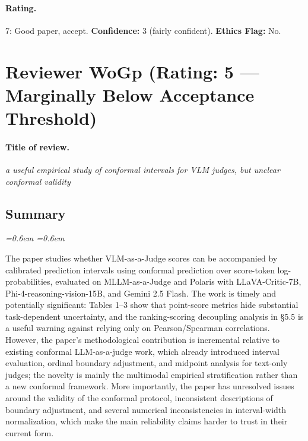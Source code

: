 \documentclass[10pt]{article}
\newenvironment{reviewerquote}{%
  \par\addvspace{0.25ex}\begingroup
  \footnotesize\itshape
  \leftskip=0.6em \rightskip=0.6em
  \color{black!78}
  \setlength{\parskip}{0.35ex plus 0.1ex}
}{%
  \endgroup\par\addvspace{0.25ex}
}
\begin{document}
\paragraph{Rating.} 7: Good paper, accept. \quad \textbf{Confidence:} 3 (fairly confident). \quad \textbf{Ethics Flag:} No.

\section{Reviewer WoGp (Rating: 5 --- Marginally Below Acceptance Threshold)}

\paragraph{Title of review.} \emph{a useful empirical study of conformal intervals for VLM judges, but unclear conformal validity}

\subsection*{Summary}
\begin{reviewerquote}
The paper studies whether VLM-as-a-Judge scores can be accompanied by calibrated prediction intervals using conformal prediction over score-token log-probabilities, evaluated on MLLM-as-a-Judge and Polaris with LLaVA-Critic-7B, Phi-4-reasoning-vision-15B, and Gemini 2.5 Flash. The work is timely and potentially significant: Tables 1--3 show that point-score metrics hide substantial task-dependent uncertainty, and the ranking-scoring decoupling analysis in \S 5.5 is a useful warning against relying only on Pearson/Spearman correlations. However, the paper's methodological contribution is incremental relative to existing conformal LLM-as-a-judge work, which already introduced interval evaluation, ordinal boundary adjustment, and midpoint analysis for text-only judges; the novelty is mainly the multimodal empirical stratification rather than a new conformal framework. More importantly, the paper has unresolved issues around the validity of the conformal protocol, inconsistent descriptions of boundary adjustment, and several numerical inconsistencies in interval-width normalization, which make the main reliability claims harder to trust in their current form.
\end{reviewerquote}
\end{document}
